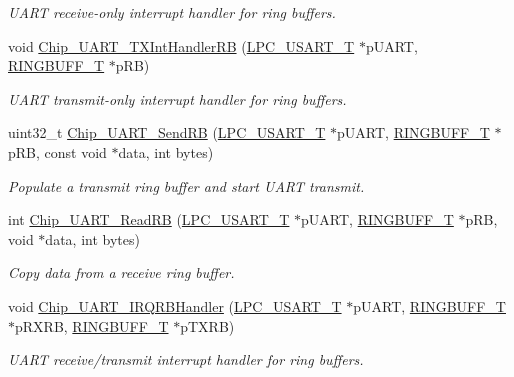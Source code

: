 \begin{DoxyCompactItemize}
\begin{DoxyCompactList}\small\item\em U\+A\+RT receive-\/only interrupt handler for ring buffers. \end{DoxyCompactList}\item 
void \hyperlink{group___u_a_r_t__18_x_x__43_x_x_ga74df5e39960a1535118fcfe2fbe90d30}{Chip\+\_\+\+U\+A\+R\+T\+\_\+\+T\+X\+Int\+Handler\+RB} (\hyperlink{struct_l_p_c___u_s_a_r_t___t}{L\+P\+C\+\_\+\+U\+S\+A\+R\+T\+\_\+T} $\ast$p\+U\+A\+RT, \hyperlink{struct_r_i_n_g_b_u_f_f___t}{R\+I\+N\+G\+B\+U\+F\+F\+\_\+T} $\ast$p\+RB)
\begin{DoxyCompactList}\small\item\em U\+A\+RT transmit-\/only interrupt handler for ring buffers. \end{DoxyCompactList}\item 
uint32\+\_\+t \hyperlink{group___u_a_r_t__18_x_x__43_x_x_ga6ed43ed19b9d2a32ece3e50bc2f651a9}{Chip\+\_\+\+U\+A\+R\+T\+\_\+\+Send\+RB} (\hyperlink{struct_l_p_c___u_s_a_r_t___t}{L\+P\+C\+\_\+\+U\+S\+A\+R\+T\+\_\+T} $\ast$p\+U\+A\+RT, \hyperlink{struct_r_i_n_g_b_u_f_f___t}{R\+I\+N\+G\+B\+U\+F\+F\+\_\+T} $\ast$p\+RB, const void $\ast$data, int bytes)
\begin{DoxyCompactList}\small\item\em Populate a transmit ring buffer and start U\+A\+RT transmit. \end{DoxyCompactList}\item 
int \hyperlink{group___u_a_r_t__18_x_x__43_x_x_gab54219751466a0fa8d9e75f8689ac99d}{Chip\+\_\+\+U\+A\+R\+T\+\_\+\+Read\+RB} (\hyperlink{struct_l_p_c___u_s_a_r_t___t}{L\+P\+C\+\_\+\+U\+S\+A\+R\+T\+\_\+T} $\ast$p\+U\+A\+RT, \hyperlink{struct_r_i_n_g_b_u_f_f___t}{R\+I\+N\+G\+B\+U\+F\+F\+\_\+T} $\ast$p\+RB, void $\ast$data, int bytes)
\begin{DoxyCompactList}\small\item\em Copy data from a receive ring buffer. \end{DoxyCompactList}\item 
void \hyperlink{group___u_a_r_t__18_x_x__43_x_x_ga8ab537af48951658e60af145690b656e}{Chip\+\_\+\+U\+A\+R\+T\+\_\+\+I\+R\+Q\+R\+B\+Handler} (\hyperlink{struct_l_p_c___u_s_a_r_t___t}{L\+P\+C\+\_\+\+U\+S\+A\+R\+T\+\_\+T} $\ast$p\+U\+A\+RT, \hyperlink{struct_r_i_n_g_b_u_f_f___t}{R\+I\+N\+G\+B\+U\+F\+F\+\_\+T} $\ast$p\+R\+X\+RB, \hyperlink{struct_r_i_n_g_b_u_f_f___t}{R\+I\+N\+G\+B\+U\+F\+F\+\_\+T} $\ast$p\+T\+X\+RB)
\begin{DoxyCompactList}\small\item\em U\+A\+RT receive/transmit interrupt handler for ring buffers. \end{DoxyCompactList}\item 

\end{DoxyCompactItemize}
